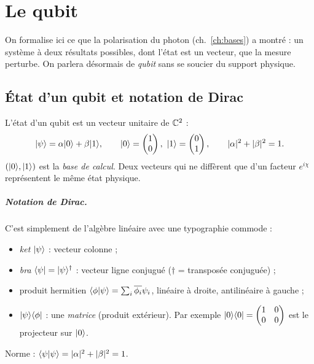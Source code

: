 \chapter{Le qubit}\label{ch:qubit}

On formalise ici ce que la polarisation du photon (ch.~\ref{ch:bases}) a montré : un système à deux résultats possibles, dont l'état est un vecteur, que la mesure perturbe. On parlera désormais de \emph{qubit} sans se soucier du support physique.

\section{État d'un qubit et notation de Dirac}
\begin{definition}[ (postulat 1)]
L'état d'un qubit est un vecteur unitaire de $\mathbb{C}^2$ :
\[\ket\psi=\alpha\ket0+\beta\ket1,\qquad \ket0=\begin{pmatrix}1\\0\end{pmatrix},\ \ket1=\begin{pmatrix}0\\1\end{pmatrix},\qquad |\alpha|^2+|\beta|^2=1.\]
$(\lvert 0\rangle,\lvert 1\rangle)$ est la \emph{base de calcul}. Deux vecteurs qui ne diffèrent que d'un facteur $e^{i\chi}$ représentent le même état physique.
\end{definition}
\paragraph{Notation de Dirac.} C'est simplement de l'algèbre linéaire avec une typographie commode :
\begin{itemize}
\item \emph{ket} $\lvert \psi\rangle$ : vecteur colonne ;
\item \emph{bra} $\langle \psi\rvert=\lvert \psi\rangle^\dagger$ : vecteur ligne conjugué ($\dagger$ = transposée conjuguée) ;
\item produit hermitien $\langle \phi\vert \psi\rangle=\sum_i\overline{\phi_i}\psi_i$, linéaire à droite, antilinéaire à gauche ;
\item $\lvert \psi\rangle\langle \phi\rvert$ : une \emph{matrice} (produit extérieur). Par exemple $\lvert 0\rangle\langle 0\rvert=\begin{pmatrix}1&0\\0&0\end{pmatrix}$ est le projecteur sur $\lvert 0\rangle$.
\end{itemize}
Norme : $\langle \psi\vert \psi\rangle=|\alpha|^2+|\beta|^2=1$.

